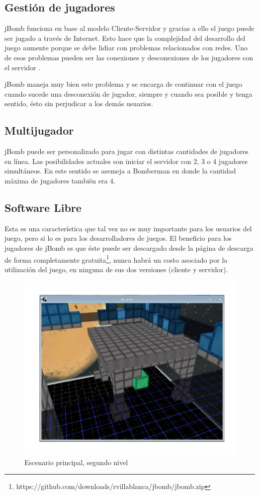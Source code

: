 \documentclass[a4paper,12pt,openany,oneside]{book}
\begin{document}
\subsection{Gestión de jugadores}
jBomb funciona en base al modelo Cliente-Servidor y gracias a ello el juego puede ser jugado a través de Internet. Esto hace que la complejidad del desarrollo del juego aumente porque se debe lidiar con problemas relacionados con redes. Uno de esos problemas pueden ser las conexiones y desconexiones de los jugadores con el servidor \cite{VALVE1}.

jBomb maneja muy bien este problema y se encarga de continuar con el juego cuando sucede una desconexión de jugador, siempre y cuando sea posible y tenga sentido, ésto sin perjudicar a los demás usuarios.
\subsection{Multijugador} 
jBomb puede ser personalizado para jugar con distintas cantidades de jugadores en línea. Las posibilidades actuales son iniciar el servidor con 2, 3 o 4 jugadores simultáneos. En este sentido se asemeja a Bomberman en donde la cantidad máxima de jugadores también era 4.
\subsection{Software Libre}
Esta es una característica que tal vez no es muy importante para los usuarios del juego, pero si lo es para los desarrolladores de juegos.
El beneficio para los jugadores de jBomb es que éste puede ser descargado desde la página de descarga de forma completamente gratuita\footnote{https://github.com/downloads/rvillablanca/jbomb/jbomb.zip}, nunca habrá un costo asociado por la utilización del juego, en ninguna de sus dos versiones (cliente y servidor).

\begin{figure}
\begin{center}
\includegraphics[scale=.7]{img3.pdf}
\end{center}
\caption[Escenario principal, segundo nivel]{Escenario principal, segundo nivel}
\end{figure}
\end{document}
